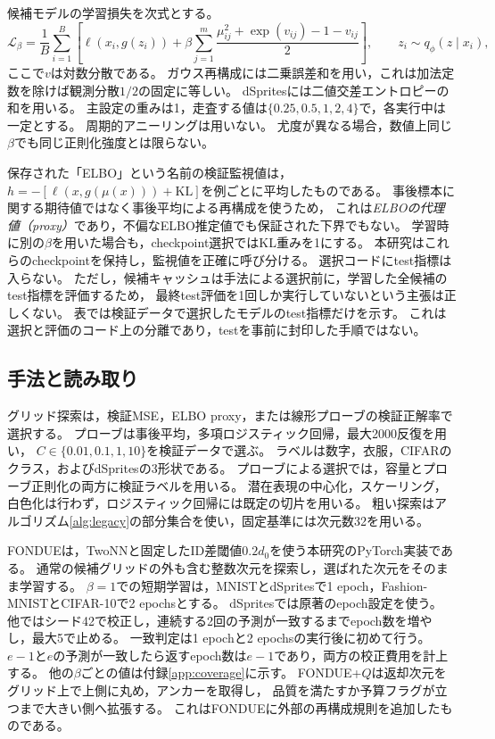 \documentclass[11pt,a4paper]{ltjsarticle}
\begin{document}
候補モデルの学習損失を次式とする。
\begin{equation}
 \mathcal L_\beta=\frac1B\sum_{i=1}^B
 \left[\ell(x_i,g(z_i))+\beta\sum_{j=1}^{m}
 \frac{\mu_{ij}^2+\exp(v_{ij})-1-v_{ij}}{2}\right],
 \qquad z_i\sim q_\phi(z\mid x_i),
 \label{eq:loss}
\end{equation}
ここで$v$は対数分散である。
ガウス再構成には二乗誤差和を用い，これは加法定数を除けば観測分散$1/2$の固定に等しい。
dSpritesには二値交差エントロピーの和を用いる。
主設定の重みは1，走査する値は$\{0.25,0.5,1,2,4\}$で，各実行中は一定とする。
周期的アニーリング\cite{fu2019cyclical}は用いない。
尤度が異なる場合，数値上同じ$\beta$でも同じ正則化強度とは限らない。

保存された「ELBO」という名前の検証監視値は，
$h=-[\ell(x,g(\mu(x)))+\mathrm{KL}]$を例ごとに平均したものである。
事後標本に関する期待値ではなく事後平均による再構成を使うため，
これは\emph{ELBOの代理値（proxy）}であり，不偏なELBO推定値でも保証された下界でもない。
学習時に別の$\beta$を用いた場合も，checkpoint選択ではKL重みを1にする。
本研究はこれらのcheckpointを保持し，監視値を正確に呼び分ける。
選択コードにtest指標は入らない。
ただし，候補キャッシュは手法による選択前に，学習した全候補のtest指標を評価するため，
最終test評価を1回しか実行していないという主張は正しくない。
表では検証データで選択したモデルのtest指標だけを示す。
これは選択と評価のコード上の分離であり，testを事前に封印した手順ではない。

\subsection{手法と読み取り}\label{sec:methods}
グリッド探索は，検証MSE，ELBO proxy，または線形プローブの検証正解率で選択する。
プローブは事後平均，多項ロジスティック回帰，最大2000反復を用い，
$C\in\{0.01,0.1,1,10\}$を検証データで選ぶ。
ラベルは数字，衣服，CIFARのクラス，およびdSpritesの3形状である。
プローブによる選択では，容量とプローブ正則化の両方に検証ラベルを用いる。
潜在表現の中心化，スケーリング，白色化は行わず，ロジスティック回帰には既定の切片を用いる。
粗い探索はアルゴリズム\ref{alg:legacy}の部分集合を使い，固定基準には次元数32を用いる。

FONDUEは，TwoNNと固定したID差閾値$0.2d_0$を使う本研究のPyTorch実装である。
通常の候補グリッドの外も含む整数次元を探索し，選ばれた次元をそのまま学習する。
$\beta=1$での短期学習は，MNISTとdSpritesで1 epoch，Fashion-MNISTとCIFAR-10で2 epochsとする。
dSpritesでは原著のepoch設定を使う。
他ではシード42で校正し，連続する2回の予測が一致するまでepoch数を増やし，最大5で止める。
一致判定は1 epochと2 epochsの実行後に初めて行う。
$e-1$と$e$の予測が一致したら返すepoch数は$e-1$であり，両方の校正費用を計上する。
他の$\beta$ごとの値は付録\ref{app:coverage}に示す。
FONDUE+$Q$は返却次元をグリッド上で上側に丸め，アンカーを取得し，
品質を満たすか予算フラグが立つまで大きい側へ拡張する。
これはFONDUEに外部の再構成規則を追加したものである。
\end{document}
